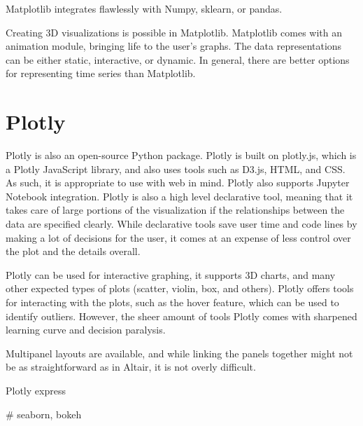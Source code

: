 Matplotlib integrates flawlessly with Numpy, sklearn, or pandas. 

Creating 3D visualizations is possible in Matplotlib. Matplotlib comes with an animation module, bringing life to the user's graphs. The data representations can be either static, interactive, or dynamic. In general, there are better options for representing time series than Matplotlib.

\section{Plotly}
\label{sec:plotly}
Plotly is also an open-source Python package. Plotly is built on plotly.js, which is a Plotly JavaScript library, and also uses tools such as D3.js, HTML, and CSS. As such, it is appropriate to use with web in mind. Plotly also supports Jupyter Notebook integration. Plotly is also a high level declarative tool, meaning that it takes care of large portions of the visualization if the relationships between the data are specified clearly. While declarative tools save user time and code lines by making a lot of decisions for the user, it comes at an expense of less control over the plot and the details overall. 

Plotly can be used for interactive graphing, it supports 3D charts, and many other expected types of plots (scatter, violin, box, and others). Plotly offers tools for interacting with the plots, such as the hover feature, which can be used to identify outliers. However, the sheer amount of tools Plotly comes with sharpened learning curve and decision paralysis. 

Multipanel layouts are available, and while linking the panels together might not be as straightforward as in Altair, it is not overly difficult. 

Plotly express

# seaborn, bokeh







